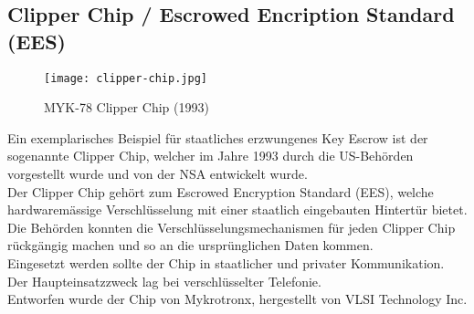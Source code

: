 	\subsection{Clipper Chip / Escrowed Encription Standard (EES)} \label{ssec:clipperchip}
\begin{figure}[H]
	\centering
	\texttt{[image: clipper-chip.jpg]}
	\caption{MYK-78 Clipper Chip (1993)}
	\label{fig:clipper-chip}
\end{figure}
Ein exemplarisches Beispiel für staatliches erzwungenes Key Escrow ist der sogenannte Clipper Chip, welcher im Jahre 1993 durch die US-Behörden vorgestellt wurde und von der NSA entwickelt wurde.\\
Der Clipper Chip gehört zum Escrowed Encryption Standard (EES), welche hardwaremässige Verschlüsselung mit einer staatlich eingebauten Hintertür bietet. Die Behörden konnten die Verschlüsselungsmechanismen für jeden Clipper Chip rückgängig machen und so an die ursprünglichen Daten kommen. \\
Eingesetzt werden sollte der Chip in staatlicher und privater Kommunikation. Der Haupteinsatzzweck lag bei verschlüsselter Telefonie. \cite{ees}\\
Entworfen wurde der Chip von Mykrotronx, hergestellt von VLSI Technology Inc. \\

